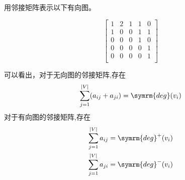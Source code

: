 \documentclass[lang=cn, thmcnt=section, chinesefont=founder, color=cyan, citestyle=gb7714-2015, bibstyle=gb7714-2015]{elegantbook}
\begin{document}
\begin{collections}
    \begin{example}
        用邻接矩阵表示以下有向图。
        \vspace{-2em}
        \begin{center}
            \vspace{-2em}
        \end{center}
    \end{example}
    \begin{solution}
        $$
        \begin{bmatrix}
            1 & 2 & 1 & 1 & 0 \\
            1 & 0 & 0 & 1 & 1 \\
            0 & 0 & 0 & 1 & 0 \\
            0 & 0 & 0 & 0 & 1 \\
            0 & 0 & 0 & 0 & 1 \\
        \end{bmatrix}
        $$
    \end{solution}
\end{collections}

可以看出，对于无向图的邻接矩阵,存在
\begin{equation*}
    \sum_{j=1}^{|V|}(a_{ij} + a_{ji})=\symrm{deg}(v_i)
\end{equation*}
对于有向图的邻接矩阵,存在
\begin{equation*}
    \begin{aligned}
        \sum_{j=1}^{|V|}a_{ij}=\symrm{deg}^+(v_i) \\
        \sum_{j=1}^{|V|}a_{ji}=\symrm{deg}^-(v_i) \\
    \end{aligned}
\end{equation*}
\end{document}
